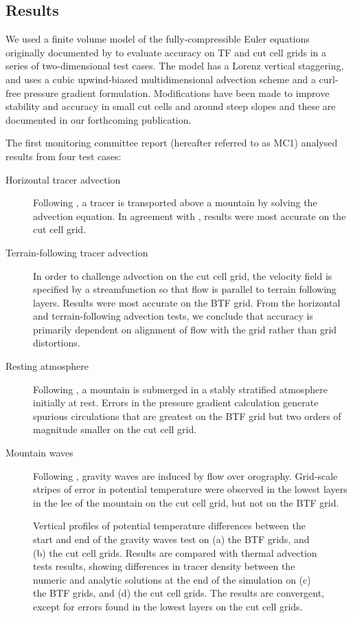 \documentclass[a4paper]{article}
\begin{document}
\subsection{Results}
We used a finite volume model of the fully-compressible Euler equations originally documented by \citet{weller-shahrokhi2014} to evaluate accuracy on TF and cut cell grids in a series of two-dimensional test cases.  The model has a Lorenz vertical staggering, and uses a cubic upwind-biased multidimensional advection scheme and a curl-free pressure gradient formulation.  Modifications have been made to improve stability and accuracy in small cut cells and around steep slopes and these are documented in our forthcoming publication.

The first monitoring committee report (hereafter referred to as MC1) analysed results from four test cases:
\begin{description}
	\item[Horizontal tracer advection]{Following \citet{schaer2002}, a tracer is transported above a mountain by solving the advection equation.  In agreement with \citet{good2014}, results were most accurate on the cut cell grid.}
	\item[Terrain-following tracer advection]{In order to challenge advection on the cut cell grid, the velocity field is specified by a streamfunction so that flow is parallel to terrain following layers.  Results were most accurate on the BTF grid.  From the horizontal and terrain-following advection tests, we conclude that accuracy is primarily dependent on alignment of flow with the grid rather than grid distortions.}
	\item[Resting atmosphere]{Following \citet{klemp2011}, a mountain is submerged in a stably stratified atmosphere initially at rest.  Errors in the pressure gradient calculation generate spurious circulations that are greatest on the BTF grid but two orders of magnitude smaller on the cut cell grid.}
	\item[Mountain waves]{Following \citet{schaer2002}, gravity waves are induced by flow over orography.  Grid-scale stripes of error in potential temperature were observed in the lowest layers in the lee of the mountain on the cut cell grid, but not on the BTF grid.}
\end{description}

\begin{figure}
	\centering
	\footnotesize
	
%
	\caption{Vertical profiles of potential temperature differences between the start and end of the gravity waves test on (a) the BTF grids, and (b) the cut cell grids.  Results are compared with thermal advection tests results, showing differences in tracer density between the numeric and analytic solutions at the end of the simulation on (c) the BTF grids, and (d) the cut cell grids.  The results are convergent, except for errors found in the lowest layers on the cut cell grids.}
	\label{fig:sampleLines}
\end{figure}
\end{document}
